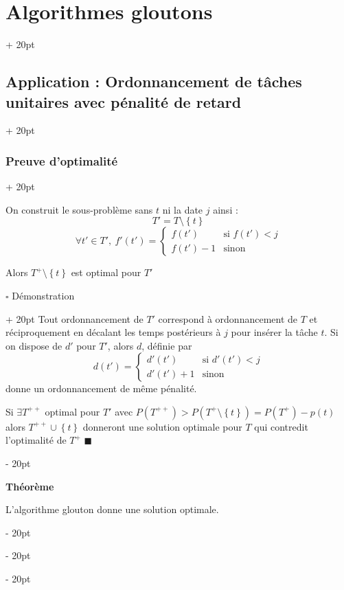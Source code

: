 \documentclass[a4paper, 12pt, twoside]{article}
\newcommand{\set}[1]{\left\{ #1 \right\}}
\newcommand{\ind}[1][20pt]{\advance\leftskip + #1}
\newcommand{\deind}[1][20pt]{\advance\leftskip - #1}
\newenvironment{indt}[2][20pt]{#2 \par \ind[#1]}{\par \deind} %
\begin{document}
\begin{indt}{\section{Algorithmes gloutons}}
\begin{indt}{\subsection{Application : Ordonnancement de tâches unitaires avec pénalité de retard}}
\begin{indt}{\subsubsection{Preuve d'optimalité}}
\begin{pseudocode}
                    On construit le sous-problème sans $t$ ni la date $j$ ainsi :
                        \[ T' = T \setminus \set t \]
                        \[
                            \forall t' \in T',\ f'(t') =
                            \left\{\!\!
                            \begin{array}{ll}
                                f(t') & \text{si $f(t') < j$}
                                \\
                                f(t') - 1 & \text{sinon}
                            \end{array}
                            \right.
                        \]
                    
                    Alors $T^+ \setminus \set t$ est optimal pour $T'$
                \end{pseudocode}
                
                \vspace{12pt}
                
                \begin{indt}{$\square$ Démonstration}
                    Tout ordonnancement de $T'$ correspond à ordonnancement de $T$ et réciproquement en décalant les temps postérieurs à $j$ pour insérer la tâche $t$. Si on dispose de $d'$ pour $T'$, alors $d$, définie par
                        \[
                            d(t') =
                            \left\{\!\!
                            \begin{array}{ll}
                                d'(t') & \text{si $d'(t') < j$}
                                \\
                                d'(t') + 1 & \text{sinon}
                            \end{array}
                            \right.
                        \]
                    donne un ordonnancement de même pénalité.
                    
                    Si $\exists T^{++}$ optimal pour $T'$ avec $P(T^{++}) > P(T^+ \setminus \set t) = P(T^+) - p(t)$
                    alors $T^{++} \cup \set t$ donneront une solution optimale pour $T$ qui contredit l'optimalité de $T^+$
                    $\blacksquare$
                \end{indt}
                
                \vspace{12pt}

                \textbf{Théorème}
                \begin{pseudocode}
                    L'algorithme glouton donne une solution optimale.
                \end{pseudocode}
                

\end{indt}
\end{indt}
\end{indt}
\end{document}
